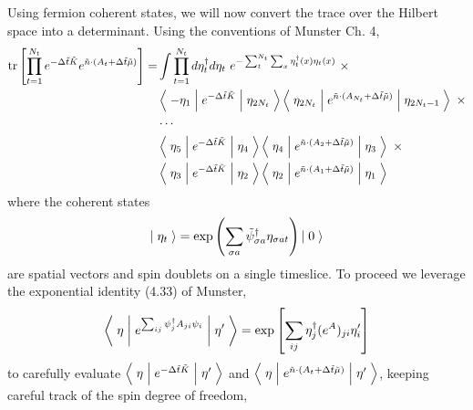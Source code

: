 Using fermion coherent states, we will now convert the trace over the Hilbert space into a determinant.
Using the conventions of Munster Ch. 4,
\begin{align}
	\text{tr}\left[\prod_{t=1}^{N_t} e^{-\Delta \tilde{t}\tilde{K}}  e^{ \tilde{n}\cdot (A_t + \Delta\tilde{t} \tilde{\mu})} \right]
	=& \int \prod_{t=1}^{N_t} d \eta^{\dagger}_t d\eta_t ~ e^{- \sum_{t}^{N_t}\sum_x \eta^{\dagger}_t(x) \eta_t(x)}~ \times
	\nonumber\\
	&
		\left\langle\; -\eta_1 \;\middle|\; e^{-\Delta \tilde{t}\tilde{K} }\;\middle|\;\eta_{2 N_t}\;\right\rangle
		\left\langle\; \eta_{2 N_t} \;\middle|\; e^{ \tilde{n} \cdot (A_{N_t} + \Delta\tilde{t}\tilde{\mu}) } \;\middle|\;\eta_{2 N_t-1}\;\right\rangle ~ \times
	\nonumber\\
	&
		\cdots
	\nonumber\\
	&
		\left\langle\; \eta_5 \;\middle|\; e^{-\Delta \tilde{t}\tilde{K} }\;\middle|\;\eta_{4}\;\right\rangle
		\left\langle\; \eta_4 \;\middle|\; e^{ \tilde{n} \cdot (A_{2} + \Delta\tilde{t}\tilde{\mu})} \;\middle|\;\eta_3\;\right\rangle ~ \times
	\nonumber\\
	&
		\left\langle\; \eta_3 \;\middle|\; e^{-\Delta \tilde{t}\tilde{K} }\;\middle|\;\eta_{2}\;\right\rangle
		\left\langle\; \eta_2 \;\middle|\; e^{ \tilde{n} \cdot (A_{1} + \Delta\tilde{t}\tilde{\mu})} \;\middle|\;\eta_1\;\right\rangle
\end{align}
where the coherent states
\begin{equation*}
	\left|\;\eta_t\;\right\rangle = \exp\left( \sum_{\sigma a} \tilde{\psi}^{\dagger}_{\sigma a} \eta_{\sigma a t} \right) \left|\;0\;\right\rangle
\end{equation*}
are spatial vectors and spin doublets on a single timeslice.
To proceed we leverage the exponential identity (4.33) of Munster,
\begin{equation}
	\left\langle\; \eta \;\middle|\; e^{\sum_{ij} \psi^{\dagger}_j A_{ji} \psi_i} \;\middle|\; \eta' \;\right\rangle
	=
	\exp\left[ \sum_{i j} \eta^{\dagger}_j (e^A)_{ji} \eta'_i \right]
\end{equation}
to carefully evaluate $\left\langle\;\eta\;\middle|\; e^{-\Delta \tilde{t}\tilde{K}} \;\middle|\;\eta'\;\right\rangle$ and $\left\langle\;\eta\;\middle|\; e^{\tilde{n}\cdot(A_t + \Delta \tilde{t} \tilde{\mu})} \;\middle|\;\eta'\;\right\rangle$, keeping careful track of the spin degree of freedom,
